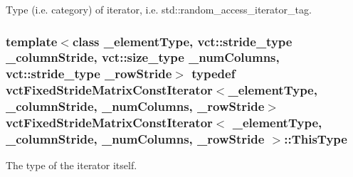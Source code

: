 Type (i.\-e. category) of iterator, i.\-e. std\-::random\-\_\-access\-\_\-iterator\-\_\-tag. \hypertarget{classvct_fixed_stride_matrix_const_iterator_a8c6ee7d655fb71d647506c3964a18e2c}{
\subsubsection[{This\-Type}]{\setlength{\rightskip}{0pt plus 5cm}template$<$class \-\_\-element\-Type, vct\-::stride\-\_\-type \-\_\-column\-Stride, vct\-::size\-\_\-type \-\_\-num\-Columns, vct\-::stride\-\_\-type \-\_\-row\-Stride$>$ typedef {\bf vct\-Fixed\-Stride\-Matrix\-Const\-Iterator}$<$\-\_\-element\-Type, \-\_\-column\-Stride, \-\_\-num\-Columns, \-\_\-row\-Stride$>$ {\bf vct\-Fixed\-Stride\-Matrix\-Const\-Iterator}$<$ \-\_\-element\-Type, \-\_\-column\-Stride, \-\_\-num\-Columns, \-\_\-row\-Stride $>$\-::{\bf This\-Type}}}\label{classvct_fixed_stride_matrix_const_iterator_a8c6ee7d655fb71d647506c3964a18e2c}
The type of the iterator itself. 

